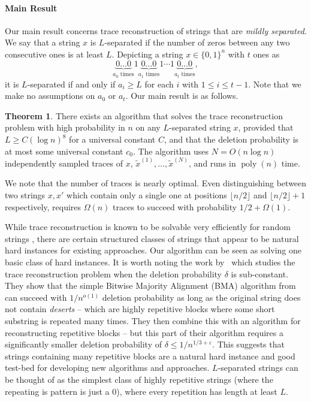 \documentclass[12pt]{article}
\theoremstyle{definition}
\newtheorem{theorem}{Theorem}[section]
\theoremstyle{remark}
\newcommand{\eps}{\varepsilon}
\DeclareMathOperator*{\poly}{poly}
\begin{document}
\paragraph{Main Result}
Our main result concerns trace reconstruction of strings that are \emph{mildly separated}. We say that a string $x$ is $L$-separated if the number of zeros between any two consecutive ones is at least $L$. Depicting a string $x\in \{0,1\}^n$ with $t$ ones as 
$$
\underbrace{0 \dots 0}_{a_0 \text{ times}} 1 \underbrace{0 \dots 0}_{a_1 \text{ times}} 1 \cdots 1 \underbrace{0 \dots 0}_{a_{t} \text{ times}},
$$
it is $L$-separated if and only if $a_i\geq L$ for each $i$ with $1\leq i\leq t-1$.
Note that we make no assumptions on $a_0$ or $a_t$. Our main result is as follows.
\begin{theorem}\label{thm:main}
There exists an algorithm that solves the trace reconstruction problem with high probability in $n$ on any $L$-separated string $x$, provided that $L\geq C(\log n)^8$ for a universal constant $C$, and that the deletion probability is at most some universal constant $c_0$. The algorithm uses $N=O(n\log n)$ independently sampled traces of $x$, $\tilde{x}^{(1)}, \dots, \tilde{x}^{(N)}$, and runs in $\poly(n)$ time.
\end{theorem}
We note that the number of traces is nearly optimal. Even distinguishing between two strings $x,x'$ which contain only a single one at positions $\lfloor n/2 \rfloor$ and $\lfloor n/2 \rfloor+1$ respectively, requires $\Omega(n)$ traces to succeed with probability $1/2+\Omega(1)$.

While trace reconstruction is known to be solvable very efficiently for random strings \cite{HoldenPP18, Rubinstein23}, there are certain structured classes of strings that appear to be natural hard instances for existing approaches.  Our algorithm can be seen as solving one basic class of hard instances.  It is worth noting the work by~\cite{ChenDLSS21a} which studies the trace reconstruction problem when the deletion probability $\delta$ is sub-constant. They show that the simple Bitwise Majority Alignment (BMA) algorithm from~\cite{BatuKKM04} can succeed with $1/n^{o(1)}$ deletion probability as long as the original string does not contain \emph{deserts} \--- which are highly repetitive blocks where some short substring is repeated many times.  They then combine this with an algorithm for reconstructing repetitive blocks \--- but this part of their algorithm requires a significantly smaller deletion probability of $\delta\leq 1/n^{1/3+\eps}$.  This suggests that strings containing many repetitive blocks are a natural hard instance and good test-bed for developing new algorithms and approaches.  $L$-separated strings can be thought of as the simplest class of highly repetitive strings (where the repeating is pattern is just a $0$), where every repetition has length at least $L$.  
\end{document}
